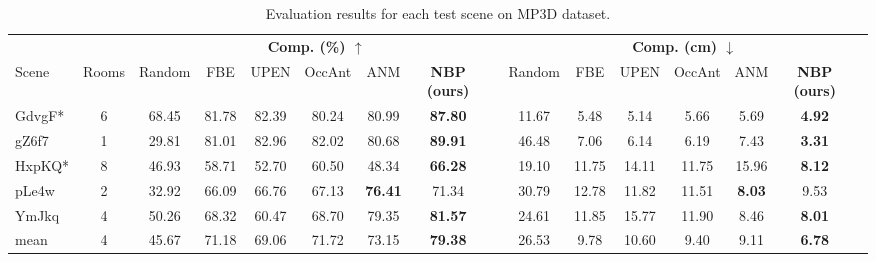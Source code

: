 \begin{table*}
\centering
\caption{Evaluation results for each test scene on MP3D dataset.}
\begin{adjustbox}{width=\textwidth}
\fontsize{14}{19}\selectfont  %
\begin{tabular}{lc|ccccccc|ccccccc}
\toprule
& & \multicolumn{7}{c|}{\textbf{Comp. (\%) $\uparrow$}} & \multicolumn{7}{c}{\textbf{Comp. (cm) $\downarrow$}} \\
Scene & Rooms & Random & FBE & UPEN & OccAnt & ANM & \textbf{NBP (ours)} & & Random & FBE & UPEN & OccAnt & ANM & \textbf{NBP (ours)} & \\
\midrule 
GdvgF* & 6 & 68.45 & 81.78 & 82.39 & 80.24 & 80.99 & \textbf{87.80} & & 11.67 & 5.48 & 5.14 & 5.66 & 5.69 & \textbf{4.92} &  \\
gZ6f7 & 1 & 29.81 & 81.01 & 82.96 & 82.02 & 80.68 & \textbf{89.91} & & 46.48 & 7.06 & 6.14 & 6.19 & 7.43 & \textbf{3.31}  & \\
HxpKQ* & 8 & 46.93 & 58.71 & 52.70 & 60.50 & 48.34 & \textbf{66.28} & & 19.10 & 11.75 & 14.11 & 11.75 & 15.96 & \textbf{8.12} & \\
pLe4w & 2 & 32.92 & 66.09 & 66.76 & 67.13 & \textbf{76.41} & 71.34 & & 30.79 & 12.78 & 11.82 & 11.51 & \textbf{8.03} & 9.53 & \\
YmJkq & 4 & 50.26 & 68.32 & 60.47 & 68.70 & 79.35 & \textbf{81.57} & & 24.61 & 11.85 & 15.77 & 11.90 & 8.46 & \textbf{8.01} & \\
mean & 4 & 45.67 & 71.18 & 69.06 & 71.72 & 73.15 & \textbf{79.38} & & 26.53 & 9.78 & 10.60 & 9.40 & 9.11 & \textbf{6.78} & \\
\bottomrule
\end{tabular}%
\end{adjustbox}

\label{tab:comparison-mp3d}
\end{table*}
